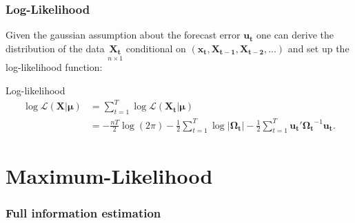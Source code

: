 \documentclass{beamer} %
\begin{document}
\begin{frame}\frametitle{Log-Likelihood}
  Given the gaussian assumption about the forecast error $\mathbf{u_t}$ one can derive the distribution of the data $\underset{n \times 1}{\mathbf{X_t}}$ conditional on
$(\mathbf{x_t},\mathbf{X_{t-1}},\mathbf{X_{t-2}},\dots)$ and set up the log-likelihood function:

\begin{block}{Log-likelihood}
\begin{align*}
\log{ \mathcal{L}(\mathbf{X}|\boldsymbol{\mu})} &= \sum_{t=1}^T \log{\mathcal{L}(\mathbf{X_t}|\boldsymbol{\mu})}\\ &=-\frac{nT}{2} \log(2\pi) - \frac{1}{2}\sum_{t=1}^{T} \log{|\boldsymbol{\Omega_t}|}- \frac{1}{2} \sum_{t=1}^T \mathbf{u_t}' \boldsymbol{\Omega_t}^{-1} \mathbf{u_t}.
\end{align*}
\end{block}
\end{frame}

\section{Maximum-Likelihood}
\begin{frame}\frametitle{Full information estimation}
  \tableofcontents[currentsection]
\end{frame}
\end{document}
